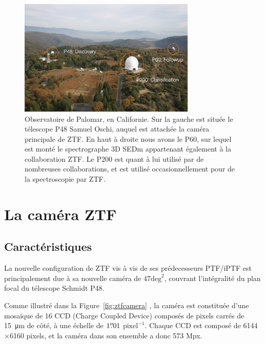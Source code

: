 \documentclass[../main/main.tex]{subfiles}
\begin{document}
\begin{figure}[h]
  \centering
  \includegraphics[width=0.75\textwidth]{../figures/02_ztf/palomar_obs-min.png}
  \caption[Observatoire de Palomar]{Observatoire de Palomar, en Californie. Sur la gauche est
    située le télescope P48 Samuel
    Oschi, auquel est attachée la caméra principale de ZTF. En haut à droite nous avons le P60, sur lequel est monté le
    spectrographe 3D SEDm appartenant également à la collaboration
    ZTF. Le P200 est quant à lui utilisé par de nombreuses
    collaborations, et est utilisé occasionnellement pour de la
    spectroscopie par ZTF.}
\label{fig:palomar_obs}
\end{figure}

\section{La caméra ZTF}
\label{sec:ztfcamera}

\subsection{Caractéristiques}

La nouvelle configuration de ZTF vis à vis de ses prédecesseurs PTF/iPTF
est principalement due à sa nouvelle caméra de $47\text{deg}^{2}$, couvrant
l'intégralité du plan focal du télescope Schmidt P48.

Comme illustré dans la Figure~\ref{fig:ztfcamera} \citep{BellmZTF2019}, la caméra est
constituée d'une mosaïque de 16 CCD (Charge Coupled Device) composés de
pixels carrés de \SI{15}{\micro\metre} de côté, à une échelle de $1\overset{\prime\prime}{.}01$
$\text{pixel}^{-1}$. Chaque CCD est composé de 6144$\times$6160 pixels,
et la caméra dans son ensemble a donc 573 Mpx. 
\end{document}
